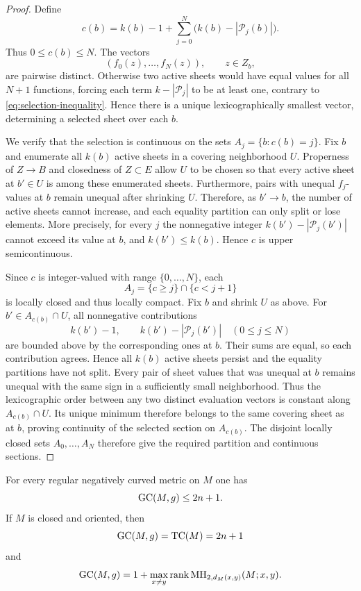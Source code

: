 \begin{proof}
Define
\[
 c(b)=k(b)-1+
 \sum_{j=0}^N
 \bigl(k(b)-|\mathcal P_j(b)|\bigr).
\]
Thus $0\leq c(b)\leq N$.
The vectors
\[
 (f_0(z),\ldots,f_N(z)),\qquad z\in Z_b,
\]
are pairwise distinct. Otherwise two
active sheets would have equal values for
all $N+1$ functions, forcing each term
$k-|\mathcal P_j|$ to be at least one,
contrary to \eqref{eq:selection-inequality}.
Hence there is a unique lexicographically
smallest vector, determining a selected
sheet over each $b$.

We verify that the selection is continuous
on the sets $A_j=\{b:c(b)=j\}$.
Fix $b$ and enumerate all $k(b)$ active
sheets in a covering neighborhood $U$.
Properness of $Z\to B$ and closedness of
$Z\subset E$ allow $U$ to be chosen so
that every active sheet at $b'\in U$
is among these enumerated sheets.
Furthermore, pairs with unequal
$f_j$-values at $b$ remain unequal after
shrinking $U$. Therefore, as $b'\to b$,
the number of active sheets cannot
increase, and each equality partition can
only split or lose elements. More precisely,
for every $j$ the nonnegative integer
$k(b')-|\mathcal P_j(b')|$ cannot exceed
its value at $b$, and $k(b')\leq k(b)$.
Hence $c$ is upper semicontinuous.

Since $c$ is integer-valued with range
$\{0,\ldots,N\}$, each
\[
 A_j=\{c\geq j\}\cap\{c<j+1\}
\]
is locally closed and thus locally compact.
Fix $b$ and shrink $U$ as above. For
$b'\in A_{c(b)}\cap U$, all nonnegative
contributions
\[
 k(b')-1,\qquad
 k(b')-|\mathcal P_j(b')|
 \quad(0\leq j\leq N)
\]
are bounded above by the corresponding
ones at $b$. Their sums are equal, so
each contribution agrees. Hence all
$k(b)$ active sheets persist and the
equality partitions have not split.
Every pair of sheet values that was
unequal at $b$ remains unequal with the
same sign in a sufficiently small
neighborhood. Thus the lexicographic
order between any two distinct evaluation
vectors is constant along
$A_{c(b)}\cap U$. Its unique minimum
therefore belongs to the same covering
sheet as at $b$, proving continuity
of the selected section on $A_{c(b)}$.
The disjoint locally closed sets
$A_0,\ldots,A_N$ therefore give the
required partition and continuous
sections.
\end{proof}

\begin{theorem}\label{thm:generic-GC}
For every regular negatively curved metric
on $M$ one has
\[
 \text{GC}(M,g)\leq 2n+1.
\]
If $M$ is closed and oriented, then
\[
 \text{GC}(M,g)=\text{TC}(M)=2n+1
\]
and
\[
 \text{GC}(M,g)
 =1+\max_{x\ne y}
   \operatorname{rank}\mathrm{MH}_{2,d_M(x,y)}(M;x,y).
\]
\end{theorem}

